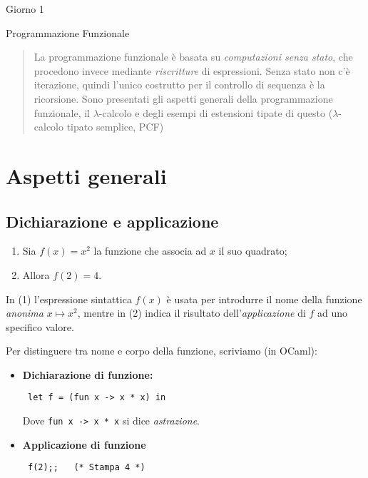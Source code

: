 \documentclass[a4paper,10pt]{article}
\begin{document}
\begin{center}
    \LARGE Giorno 1
    
    \Large Programmazione Funzionale
\end{center}\smallskip

\begin{abstract}

 La programmazione funzionale è basata su \emph{computazioni senza stato}, che procedono invece mediante \emph{riscritture} di espressioni. Senza stato non c'è iterazione, quindi l'unico costrutto per il controllo di sequenza è la ricorsione. Sono presentati gli aspetti generali della programmazione funzionale, il $\lambda$-calcolo e degli esempi di estensioni tipate di questo ($\lambda$-calcolo tipato semplice, PCF)
\end{abstract}

\section{Aspetti generali}
\subsection{Dichiarazione e applicazione}
\begin{enumerate}
 \item Sia $f(x) = x^2$ la funzione che associa ad $x$ il suo quadrato; 
 \item Allora $f(2) = 4$.

\end{enumerate}

In (1) l'espressione sintattica $f(x)$ è usata per introdurre il nome della funzione \emph{anonima} $x \mapsto x^2$, mentre in (2) indica il risultato dell'\emph{applicazione} di $f$ ad uno specifico valore.\smallskip

Per distinguere tra nome e corpo della funzione, scriviamo (in OCaml):

\begin{itemize}
 \item \textbf{Dichiarazione di funzione:}
\begin{lstlisting}
 let f = (fun x -> x * x) in
\end{lstlisting}

Dove \texttt{fun x -> x * x} si dice \emph{astrazione}.
\lstset{firstnumber=last}
\item \textbf{Applicazione di funzione}
\begin{lstlisting}
 f(2);;   (* Stampa 4 *)
\end{lstlisting}
\end{itemize}
\end{document}
